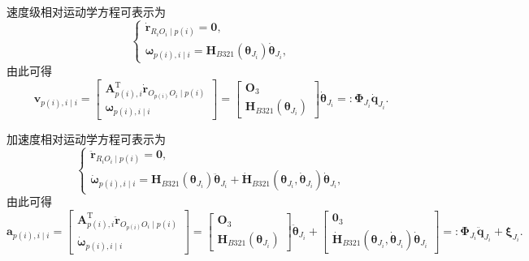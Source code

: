 速度级相对运动学方程可表示为
\begin{equation}\label{eq:10.32}
  \begin{cases}
    \dot{\boldsymbol{r}}_{R_i O_i \mid p(i)} = \boldsymbol{0}, \\
    \boldsymbol{\omega}_{p(i),i \mid i} = \boldsymbol{H}_{B321}(\boldsymbol{\theta}_{J_i}) \dot{\boldsymbol{\theta}}_{J_i},
  \end{cases}
\end{equation}
由此可得
\begin{equation}\label{eq:10.33}
  \boldsymbol{v}_{p(i),i \mid i} = \begin{bmatrix} \boldsymbol{A}_{p(i),i}^{\mathrm{T}} \dot{\boldsymbol{r}}_{O_{p(i)} O_i \mid p(i)} \\ \boldsymbol{\omega}_{p(i),i \mid i} \end{bmatrix}
  = \begin{bmatrix} \boldsymbol{O}_3 \\ \boldsymbol{H}_{B321}(\boldsymbol{\theta}_{J_i}) \end{bmatrix} \dot{\boldsymbol{\theta}}_{J_i}
  =: \boldsymbol{\Phi}_{J_i} \dot{\boldsymbol{q}}_{J_i}.
\end{equation}

加速度相对运动学方程可表示为
\begin{equation}\label{eq:10.34}
  \begin{cases}
    \ddot{\boldsymbol{r}}_{R_i O_i \mid p(i)} = \boldsymbol{0}, \\
    \dot{\boldsymbol{\omega}}_{p(i),i \mid i} = \boldsymbol{H}_{B321}(\boldsymbol{\theta}_{J_i}) \ddot{\boldsymbol{\theta}}_{J_i} + \dot{\boldsymbol{H}}_{B321}(\boldsymbol{\theta}_{J_i}, \dot{\boldsymbol{\theta}}_{J_i}) \dot{\boldsymbol{\theta}}_{J_i},
  \end{cases}
\end{equation}
由此可得
\begin{equation}\label{eq:10.35}
  \boldsymbol{a}_{p(i),i \mid i} = \begin{bmatrix} \boldsymbol{A}_{p(i),i}^{\mathrm{T}} \ddot{\boldsymbol{r}}_{O_{p(i)} O_i \mid p(i)} \\ \dot{\boldsymbol{\omega}}_{p(i),i \mid i} \end{bmatrix}
  = \begin{bmatrix} \boldsymbol{O}_3 \\ \boldsymbol{H}_{B321}(\boldsymbol{\theta}_{J_i}) \end{bmatrix} \ddot{\boldsymbol{\theta}}_{J_i}
  + \begin{bmatrix} \boldsymbol{0}_3 \\ \dot{\boldsymbol{H}}_{B321}(\boldsymbol{\theta}_{J_i}, \dot{\boldsymbol{\theta}}_{J_i}) \dot{\boldsymbol{\theta}}_{J_i} \end{bmatrix}
  =: \boldsymbol{\Phi}_{J_i} \ddot{\boldsymbol{q}}_{J_i} + \boldsymbol{\xi}_{J_i}.
\end{equation}

